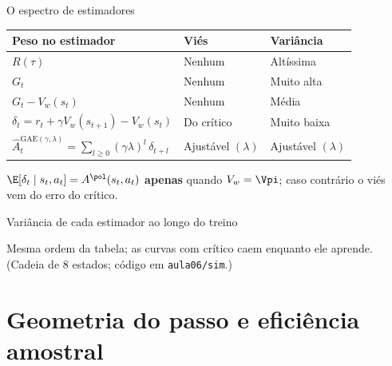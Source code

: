 \documentclass[aspectratio=169, 11pt]{beamer}
\newcommand{\Ahat}{\hat{A}}
\begin{document}
\begin{frame}{O espectro de estimadores}
  \footnotesize\setlength{\tabcolsep}{4pt}
  \begin{tabular}{@{}lll@{}}
    \toprule
    \textbf{Peso no estimador} & \textbf{Viés} & \textbf{Variância} \\
    \midrule
    $R(\tau)$ & Nenhum & Altíssima \\
    $G_t$ & Nenhum & Muito alta \\
    $G_t - V_w(s_t)$ & Nenhum & Média \\
    $\delta_t = r_t + \gamma V_w(s_{t+1}) - V_w(s_t)$ & Do crítico & Muito baixa \\
    \rowcolor{rlAzulClaro!8}
    $\Ahat_t^{\mathrm{GAE}(\gamma,\lambda)} = \sum_{l\ge0}(\gamma\lambda)^l\,\delta_{t+l}$ & Ajustável $(\lambda)$ & Ajustável $(\lambda)$ \\
    \bottomrule
  \end{tabular}

  \vspace{0.6em}
  \begin{alertabox}[title={Preço do TD}]
    $\E[\delta_t\mid s_t,a_t] = A^{\pol}(s_t,a_t)$ \textbf{apenas} quando $V_w = \Vpi$;
    caso contrário o viés vem do erro do crítico.
  \end{alertabox}
\end{frame}

\begin{frame}{Variância de cada estimador ao longo do treino}
  \begin{center}
    
  \end{center}
  {\small Mesma ordem da tabela; as curvas com crítico caem enquanto ele aprende.
  \color{rlCinza}(Cadeia de 8 estados; código em \texttt{aula06/sim}.)}
\end{frame}

\section{Geometria do passo e eficiência amostral}
\end{document}
